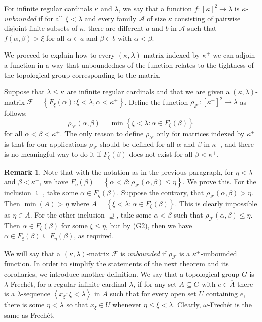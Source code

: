 \documentclass{amsart}
\theoremstyle{plain}
\theoremstyle{definition}
\newtheorem{remark}[theorem]{Remark}
\numberwithin{equation}{section}
\renewcommand{\a}{\alpha}
\renewcommand{\b}{\beta}
\renewcommand{\k}{\kappa}
\renewcommand{\o}{\omega}
\renewcommand{\l}{\lambda}
\newcommand{\sst}{\subseteq}
\newcommand{\F}{\mathcal F}
\newcommand{\seq}[1]{\left<#1\right>}
\newcommand{\set}[1]{\left\{#1\right\}}
\begin{document}
For infinite regular cardinals $\k$ and $\l$, we say that a function $f:[\k]^2\to \l$ is \emph{$\k$-unbounded} if for all $\xi<\l$ and every family $\mathcal A$ of size $\k$ consisting of pairwise disjoint finite subsets of $\k$, there are different $a$ and $b$ in $\mathcal A$ such that $f(\a,\b)>\xi$ for all $\a\in a$ and $\b\in b$ with $\a<\b$.

We proceed to explain how to every $(\k,\l)$-matrix indexed by $\k^+$ we can adjoin a function in a way that unboundednes of the function relates to the tightness of the topological group corresponding to the matrix.

Suppose that $\l\le\k$ are infinite regular cardinals and that we are given a $(\k,\l)$-matrix $\mathcal F=\set{F_{\xi}(\a):\xi<\l,\a<\k^+}$.
Define the function $\rho_{\mathcal F}:[\k^+]^2\to \l$ as follows: $$\rho_{\mathcal F}(\a,\b)=\min\set{\xi<\l: \a\in F_{\xi}(\b)}$$ for all $\a<\b<\k^+$.
The only reason to define $\rho_{\mathcal F}$ only for matrices indexed by $\k^+$ is that for our applications $\rho_{\mathcal F}$ should be defined for all $\a$ and $\b$ in $\k^+$, and there is no meaningful way to do it if $F_{\xi}(\b)$ does not exist for all $\b<\k^+$.

\begin{remark}\label{r:funcmatr}
	Note that with the notation as in the previous paragraph, for $\eta<\l$ and $\b<\k^+$, we have $F_{\eta}(\b)=\set{\a<\b:\rho_{\mathcal F}(\a,\b)\le \eta}$.
	We prove this.
	For the inclusion $\sst$, take some $\a\in F_{\eta}(\b)$.
	Suppose the contrary, that $\rho_{\mathcal F}(\a,\b)>\eta$.
	Then $\min(A)>\eta$ where $A=\set{\xi<\l:\a\in F_{\xi}(\b)}$.
	This is clearly impossible as $\eta\in A$.
	For the other inclusion $\supseteq$, take some $\a<\b$ such that $\rho_{\mathcal F}(\a,\b)\le\eta$.
	Then $\a\in F_{\xi}(\b)$ for some $\xi\le\eta$, but by (G2), then we have $\a\in F_{\xi}(\beta)\sst F_{\eta}(\b)$, as required.
\end{remark}

We will say that a $(\k,\l)$-matrix $\F$ is \emph{unbounded} if $\rho_{\mathcal F}$ is a $\k^+$-unbounded function.
In order to simplify the statements of the next theorem and its corollaries, we introduce another definition.
We say that a topological group $G$ is $\l$-Frech\'et, for a regular infinite cardinal $\l$, if for any set $A\sst G$ with $e\in\overline{A}$ there is a $\l$-sequence $\seq{x_{\xi}:\xi<\l}$ in $A$ such that for every open set $U$ containing $e$, there is some $\eta<\l$ so that $x_{\xi}\in U$ whenever $\eta\le\xi<\l$.
Clearly, $\o$-Frech\'et is the same as Frech\'et.
\end{document}
